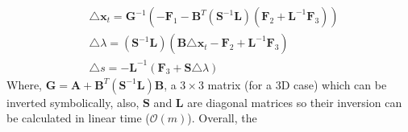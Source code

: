 \documentclass[12pt,a4]{article}
\begin{document}
\begin{align}
&\triangle \textbf{x}_t=\textbf{G}^{-1}(-\textbf{F}_1-\textbf{B}^T(\textbf{S}^{-1}\textbf{L})(\textbf{F}_2+\textbf{L}^{-1}\textbf{F}_3)) \nonumber \\
&\triangle\lambda=(\textbf{S}^{-1}\textbf{L})(\textbf{B}\triangle \textbf{x}_t -\textbf{F}_2+\textbf{L}^{-1}\textbf{F}_3)\\
&\triangle s = -\textbf{L}^{-1}(\textbf{F}_3+\textbf{S}\triangle \lambda) \nonumber
\end{align}
 Where, $\textbf{G}= \textbf{A}+\textbf{B}^T(\textbf{S}^{-1}\textbf{L})\textbf{B}$, a $3\times3$ matrix (for a 3D case) which can be inverted symbolically, also, $\textbf{S}$ and $\textbf{L}$ are diagonal matrices so their inversion can be calculated in linear time ($\mathcal{O}(m)$). Overall, the 
\end{document}
